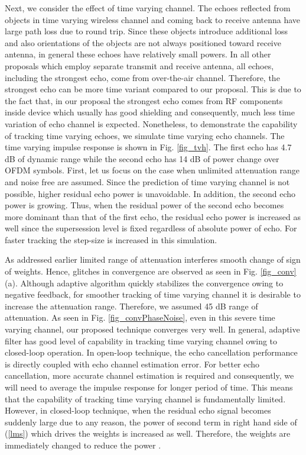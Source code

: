 \documentclass[twocolumn]{IEEEtran}
\begin{document}
Next, we consider the effect of time varying channel. The echoes
reflected from objects in time varying wireless channel and coming
back to receive antenna have large path loss due to round trip.
Since these objects introduce additional loss and also orientations
of the objects are not always positioned toward receive antenna, in
general these echoes have relatively small powers. In all other
proposals which employ separate transmit and receive antenna, all
echoes, including the strongest echo, come from over-the-air
channel. Therefore, the strongest echo can be more time variant
compared to our proposal. This is due to the fact that, in our
proposal the strongest echo comes from RF components inside device
which usually has good shielding and consequently, much less time
variation of echo channel is expected. Nonetheless, to demonstrate
the capability of tracking time varying echoes, we simulate time
varying echo channels. The time varying impulse response is shown in
Fig. \ref{fig_tvh}. The first echo has 4.7 dB of dynamic range while
the second echo has 14 dB of power change over  OFDM
symbols. First, let us focus on the case when unlimited attenuation
range and noise free are assumed. Since the prediction of time
varying channel is not possible, higher residual echo power is
unavoidable. In addition, the second echo power is growing. Thus,
when the residual power of the second echo becomes more dominant
than that of the first echo, the residual echo power is increased as
well since the supersession level is fixed regardless of absolute
power of echo. For faster tracking the step-size is increased in
this simulation.

As addressed earlier limited range of attenuation interferes smooth
change of sign of weights. Hence, glitches in convergence are
observed as seen in Fig. \ref{fig_conv} (a). Although adaptive
algorithm quickly stabilizes the convergence owing to negative
feedback, for smoother tracking of time varying channel it is
desirable to increase the attenuation range. Therefore, we assumed
45 dB range of attenuation. As seen in Fig.
\ref{fig_convPhaseNoise}, even in this severe time varying channel,
our proposed technique converges very well. In general, adaptive
filter has good level of capability in tracking time varying channel
owing to closed-loop operation. In open-loop technique, the echo
cancellation performance is directly coupled with echo channel
estimation error. For better echo cancellation, more accurate
channel estimation is required and consequently, we will need to
average the impulse response for longer period of time. This means
that the capability of tracking time varying channel is
fundamentally limited. However, in closed-loop technique, when the
residual echo signal  becomes suddenly large due to
any reason, the power of second term in right hand side of
(\ref{lms}) which drives the weights is increased as well.
Therefore, the weights are immediately changed to reduce the power
.
\end{document}
